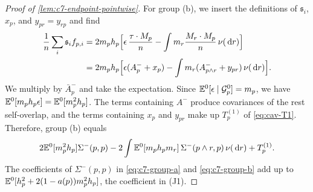 \begin{proof}[Proof of \cref{lem:c7-endpoint-pointwise}]
For group (b), we insert the definitions of $\mathfrak s_i$, $x_p$, and
$y_{pr}=y_{rp}$ and find
\[
 \begin{aligned}
 \frac1n\sum_i\mathfrak s_if_{p,i}
 &=2m_ph_p\Bigl[\epsilon\,\frac{\tau\cdot M_p}n
 -\int m_r\frac{M_r\cdot M_p}n\,\nu(\,\mathrm d r)\Bigr]\\
 &=2m_ph_p\Bigl[\epsilon(A_p^-+x_p)
 -\int m_r(A_{p\wedge r}^-+y_{pr})\,\nu(\,\mathrm d r)\Bigr].
 \end{aligned}
\]
We multiply by $\bar A_p^-$ and take the expectation. Since
$\mathbb E^0[\epsilon\mid\mathcal G^0_p]=m_p$, we have
$\mathbb E^0[m_ph_p\epsilon]=\mathbb E^0[m_p^2h_p]$. The terms containing $A^-$
produce covariances of the rest self-overlap, and the terms containing
$x_p$ and $y_{pr}$ make up $T_p^{(1)}$ of \eqref{eq:cav-T1}. Therefore,
group (b) equals
\begin{equation}\label{eq:c7-group-b}
 2\mathbb E^0[m_p^2h_p]\Sigma^-(p,p)
 -2\int\mathbb E^0[m_ph_pm_r]\,\Sigma^-(p\wedge r,p)\,\nu(\,\mathrm d r)
 +T_p^{(1)}.
\end{equation}
The coefficients of $\Sigma^-(p,p)$ in \eqref{eq:c7-group-a} and
\eqref{eq:c7-group-b} add up to
$\mathbb E^0[h_p^2+2(1-a(p))m_p^2h_p]$, the coefficient in (J1).


\end{proof}
